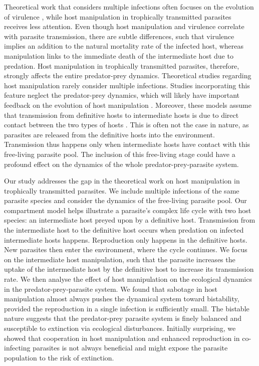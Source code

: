 \documentclass[a4paper]{scrartcl}
\begin{document}
Theoretical work that considers multiple infections often focuses on the evolution of virulence \citep{vanBaalen1995, Alizon2013, Alizon2008, Choisy2010, Alizon2012}, while host manipulation in trophically transmitted parasites receives less attention. 
Even though host manipulation and virulence correlate with parasite transmission, there are subtle differences, such that virulence implies an addition to the natural mortality rate of the infected host, whereas manipulation links to the immediate death of the intermediate host due to predation. 
Host manipulation in trophically transmitted parasites, therefore, strongly affects the entire predator-prey dynamics. 
Theoretical studies regarding host manipulation rarely consider multiple infections. 
Studies incorporating this feature neglect the predator-prey dynamics, which will likely have important feedback on the evolution of host manipulation \citep{Parker2003,Vickery2009}.
Moreover, these models assume that transmission from definitive hosts to intermediate hosts is due to direct contact between the two types of hosts \citep{Rogawa2018, Hadeler1989, Fenton2006}. 
This is often not the case in nature, as parasites are released from the definitive hosts into the environment. 
Transmission thus happens only when intermediate hosts have contact with this free-living parasite pool. The inclusion of this free-living stage could have a profound effect on the dynamics of the whole predator-prey-parasite system.


Our study addresses the gap in the theoretical work on host manipulation in trophically transmitted parasites.
We include multiple infections of the same parasite species and consider the dynamics of the free-living parasite pool. 
Our compartment model helps illustrate a parasite's complex life cycle with two host species: an intermediate host preyed upon by a definitive host. 
Transmission from the intermediate host to the definitive host occurs when predation on infected intermediate hosts happens. 
Reproduction only happens in the definitive hosts. 
New parasites then enter the environment, where the cycle continues. 
We focus on the intermediate host manipulation, such that the parasite increases the uptake of the intermediate host by the definitive host to increase its transmission rate. 
We then analyse the effect of host manipulation on the ecological dynamics in the predator-prey-parasite system. 
We found that sabotage in host manipulation almost always pushes the dynamical system toward bistability, provided the reproduction in a single infection is sufficiently small. 
The bistable nature suggests that the predator-prey parasite system is finely balanced and susceptible to extinction via ecological disturbances. 
Initially surprising, we showed that cooperation in host manipulation and enhanced reproduction in co-infecting parasites is not always beneficial and might expose the parasite population to the risk of extinction.
\end{document}
